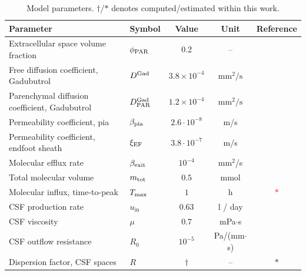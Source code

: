 \documentclass[fleqn,10pt]{wlscirep}
\newcommand{\fixme}[1]{\textcolor{red}{#1}}
\begin{document}
\begin{table}
  \begin{center}
    \begin{tabular}{ll|ccc}
      \toprule
      Parameter& Symbol & Value & Unit& Reference\\
      \midrule
      Extracellular space volume fraction & $\phi_{\rm PAR}$ & 0.2 & -- & \cite{nicholson1981ion} \\
      Free diffusion coefficient, Gadubutrol & $D^{\rm Gad}$ & $3.8 \times 10^{-4}$& $\text{mm}^2/\text{s}$ & \cite{valnes2020apparent}\\
      Parenchymal diffusion coefficient, Gadubutrol & $D^{\rm Gad}_{\rm PAR}$ & $1.2 \times 10^{-4}$ & $\text{mm}^2/\text{s}$  & \cite{hornkjol2022csf} \\
      Permeability coefficient, pia & $\beta_{\rm pia}$ & $2.6 \cdot 10^{-8}$ & m/s & \cite{riseth2025twocompartment} \\
      Permeability coefficient, endfoot sheath & $\xi_{\rm EF}$ & $3.8\cdot 10^{-7}$  & m/s & \cite{koch2023estimates} \\
      Molecular efflux rate & $\beta_{\rm exit}$ & $10^{-4}$ & mm$^2$/s & \cite{hornkjol2022csf} \\
      Total molecular volume & $m_{\rm tot}$ & $0.5$ & mmol & \cite{eide2024functional} \\
      Molecular influx, time-to-peak & $T_{\rm max}$ & $1$ & h & \fixme{$\ast$} \\
      CSF production rate & $u_{\mathrm{in}}$ & $0.63$  & l / day & \cite{nilsson1992circadian} \\
      CSF viscosity & $\mu$ & $0.7$ & mPa$ \cdot $s & \cite{bloomfield1998effects} \\ 
      CSF outflow resistance & $R_0$ & $10^{-5}$  & Pa/(mm$\cdot$s) & \cite{hornkjol2022csf} \\ 
      Dispersion factor, CSF spaces & $R$ & $\dagger$ & -- & $\ast$ \\
      \bottomrule
    \end{tabular}
  \end{center}
  \caption{Model parameters. $\dagger$/$\ast$ denotes computed/estimated within this work.}
  \label{tab:parameters}
\end{table}
\end{document}
